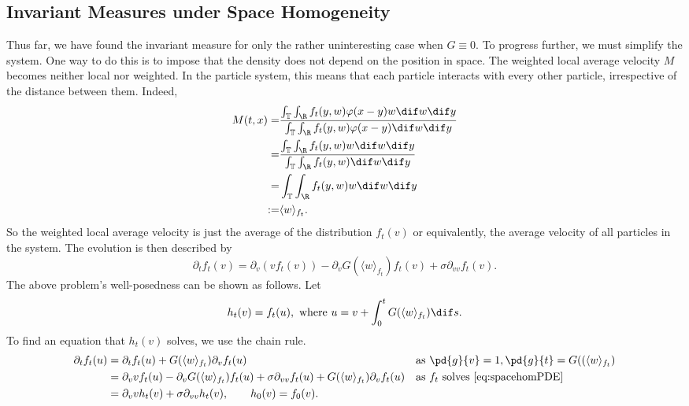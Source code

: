       \subsection{Invariant Measures under Space Homogeneity}\label{sec:hominvmeas}
      Thus far, we have found the invariant measure for only the rather uninteresting case when $G \equiv 0$. To progress further, we must simplify the system. One way to do this is to impose that the density does not depend on the position in space. The weighted local average velocity $M$ becomes neither local nor weighted. In the particle system, this means that each particle interacts with every other particle, irrespective of the distance between them. Indeed,
      \begin{align*}
      M(t,x) =&  \frac{\int_{\T}\int_{\R}f_t(y,w)\phi(x-y)w\dif w \dif y}{\int_{\T}\int_{\R}f_t(y,w)\phi(x-y)\dif w \dif y}\\
      =&  \frac{\int_{\T}\int_{\R}f_t(y,w)w\dif w \dif y}{\int_{\T}\int_{\R}f_t(y,w)\dif w \dif y}\\
      =& \int_{\T}\int_{\R}f_t(y,w)w\dif w \dif y\\
      :=& \langle w \rangle_{f_t}.
      \end{align*}
      So the weighted local average velocity is just the average of the distribution $f_t(v)$ or equivalently, the average velocity of all particles in the system. The evolution is then described by
      \begin{equation}\label{eq:spacehomPDE}
      \partial_t f_t(v) = \partial_v \left(vf_t(v)\right) - \partial_v G(\langle w \rangle_{f_t})f_t(v) + \sigma \partial_{vv} f_t(v).
      \end{equation}
      The above problem's well-posedness can be shown as follows. Let
      \[
      h_t(v) = f_t(u),\text{ where } u = v + \int_0^t G(\langle w\rangle_{f_t}) \dif s.
      \]
      To find an equation that $h_t(v)$ solves, we use the chain rule.
      \begin{align*}
      \partial_t f_t(u) &= \partial_t f_t(u) +  G(\langle w\rangle_{f_t})\partial_v f_t(u) && \text{as   } \pd{g}{v} = 1, \pd{g}{t} = G((\langle w\rangle_{f_t})\\
      &=\partial_v vf_t(u) - \partial_v G(\langle w \rangle_{f_t})f_t(u) + \sigma \partial_{vv} f_t(u) + G(\langle w\rangle_{f_t})\partial_v f_t(u) &&\text{as  } f_t \text{ solves } \eqref{eq:spacehomPDE}\\
      &=\partial_v vh_t(v) + \sigma \partial_{vv} h_t(v) , \qquad h_0(v) =f_0(v).
      \end{align*}
